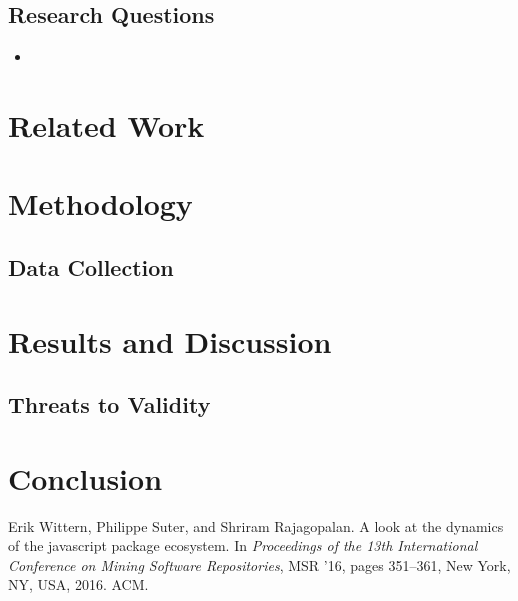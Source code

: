 \documentclass[10pt,conference]{IEEEtran}
\begin{document}
\subsection{Research Questions}
\begin{itemize}
  \item 

\end{itemize}



\section{Related Work}


\section{Methodology}


\subsection{Data Collection}

\section{Results and Discussion}


\subsection{Threats to Validity}



\section{Conclusion}


\begin{thebibliography}{00}
  Erik Wittern, Philippe Suter, and Shriram Rajagopalan.
  \newblock A look at the dynamics of the javascript package ecosystem.
  \newblock In {\em Proceedings of the 13th International Conference on Mining
    Software Repositories}, MSR '16, pages 351--361, New York, NY, USA, 2016.
    ACM.



\end{thebibliography}
\vspace{12pt}
\end{document}
